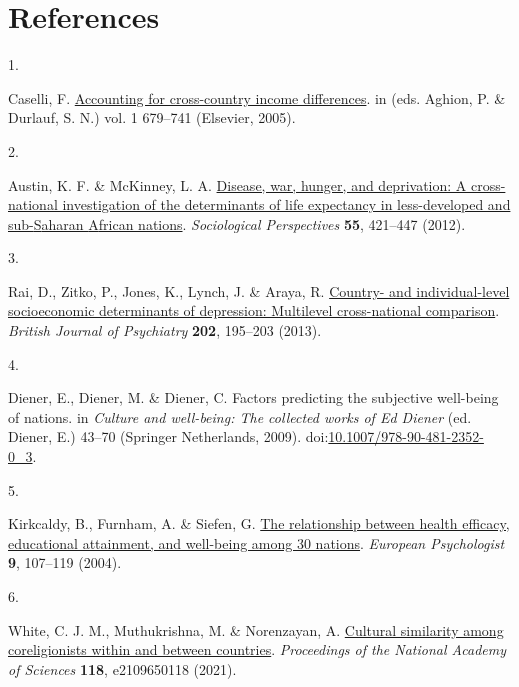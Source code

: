 \documentclass[
  man,floatsintext]{apa6}
\newlength{\cslhangindent}
\newlength{\csllabelwidth}
\newlength{\cslentryspacingunit} %
\newenvironment{CSLReferences}[2] %
 {%
  \setlength{\parindent}{0pt}
  \ifodd #1
  \let\oldpar\par
  \def\par{\hangindent=\cslhangindent\oldpar}
  \fi
  \setlength{\parskip}{#2\cslentryspacingunit}
 }%
 {}
\newcommand{\CSLLeftMargin}[1]{\parbox[t]{\csllabelwidth}{#1}}
\newcommand{\CSLRightInline}[1]{\parbox[t]{\linewidth - \csllabelwidth}{#1}\break}
\begin{document}
\newpage

\hypertarget{references}{%
\section{References}\label{references}}

\begingroup
\setlength{\parindent}{-0.5in}
\setlength{\leftskip}{0.5in}

\hypertarget{refs}{}
\begin{CSLReferences}{0}{0}
\leavevmode{}%
\CSLLeftMargin{1. }%
\CSLRightInline{Caselli, F. \href{https://doi.org/10.1016/S1574-0684(05)01009-9}{Accounting for cross-country income differences}. in (eds. Aghion, P. \& Durlauf, S. N.) vol. 1 679--741 (Elsevier, 2005).}

\leavevmode{}%
\CSLLeftMargin{2. }%
\CSLRightInline{Austin, K. F. \& McKinney, L. A. \href{https://doi.org/10.1525/sop.2012.55.3.421}{Disease, war, hunger, and deprivation: A cross-national investigation of the determinants of life expectancy in less-developed and sub-{S}aharan {A}frican nations}. \emph{Sociological Perspectives} \textbf{55}, 421--447 (2012).}

\leavevmode{}%
\CSLLeftMargin{3. }%
\CSLRightInline{Rai, D., Zitko, P., Jones, K., Lynch, J. \& Araya, R. \href{https://doi.org/10.1192/bjp.bp.112.112482}{Country- and individual-level socioeconomic determinants of depression: Multilevel cross-national comparison}. \emph{British Journal of Psychiatry} \textbf{202}, 195--203 (2013).}

\leavevmode{}%
\CSLLeftMargin{4. }%
\CSLRightInline{Diener, E., Diener, M. \& Diener, C. Factors predicting the subjective well-being of nations. in \emph{Culture and well-being: The collected works of {E}d {D}iener} (ed. Diener, E.) 43--70 (Springer Netherlands, 2009). doi:\href{https://doi.org/10.1007/978-90-481-2352-0_3}{10.1007/978-90-481-2352-0\_3}.}

\leavevmode{}%
\CSLLeftMargin{5. }%
\CSLRightInline{Kirkcaldy, B., Furnham, A. \& Siefen, G. \href{https://doi.org/10.1027/1016-9040.9.2.107}{The relationship between health efficacy, educational attainment, and well-being among 30 nations}. \emph{European Psychologist} \textbf{9}, 107--119 (2004).}

\leavevmode{}%
\CSLLeftMargin{6. }%
\CSLRightInline{White, C. J. M., Muthukrishna, M. \& Norenzayan, A. \href{https://doi.org/10.1073/pnas.2109650118}{Cultural similarity among coreligionists within and between countries}. \emph{Proceedings of the National Academy of Sciences} \textbf{118}, e2109650118 (2021).}


\end{CSLReferences}
\end{document}
